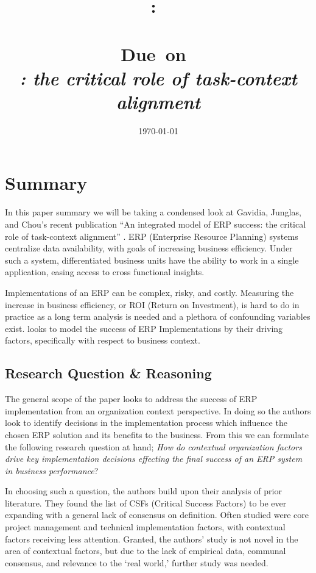 \documentclass{article}
\title{
    \vspace{2in}
    \textmd{\textbf{\hmwkClass:\ \\ \hmwkTitle}}\\
    \normalsize\vspace{0.1in}\small{Due\ on\ \hmwkDueDate}\\
    \vspace{0.1in}\Large{\textit{\paprTitle: the critical role of task-context alignment}}
    \vspace{3in}
}
\author{\hmwkAuthorName}
\date{\today}
\begin{document}
\maketitle

\pagebreak

\tableofcontents
\listoffigures
\newpage

\section{Summary}
In this paper summary we will be taking a condensed look at Gavidia, Junglas, and Chou's recent publication ``An integrated model of ERP success: the critical role of task-context alignment'' \cite{integrated_erp}.
ERP (Enterprise Resource Planning) systems centralize data availability, with goals of increasing business efficiency.  
Under such a system, differentiated business units have the ability to work in a single application, easing access to cross functional insights. 

Implementations of an ERP can be complex, risky, and costly. 
Measuring the increase in business efficiency, or ROI (Return on Investment), is hard to do in practice as a long term analysis is needed and a plethora of confounding variables exist. 
\cite{integrated_erp} looks to model the success of ERP Implementations by their driving factors, specifically with respect to business context. 

\subsection{Research Question \& Reasoning}
The general scope of the paper looks to address the success of ERP implementation from an organization context perspective. 
In doing so the authors look to identify decisions in the implementation process which influence the chosen ERP solution and its benefits to the business. 
From this we can formulate the following research question at hand; \emph{How do contextual organization factors drive key implementation decisions effecting the final success of an ERP system in business performance}? 

In choosing such a question, the authors build upon their analysis of prior literature. 
They found the list of CSFs (Critical Success Factors) to be ever expanding with a general lack of consensus on definition. 
Often studied were core project management and technical implementation factors, with contextual factors receiving less attention. 
Granted, the authors' study is not novel in the area of contextual factors, but due to the lack of empirical data, communal consensus, and relevance to the `real world,' further study was needed. 
\end{document}
